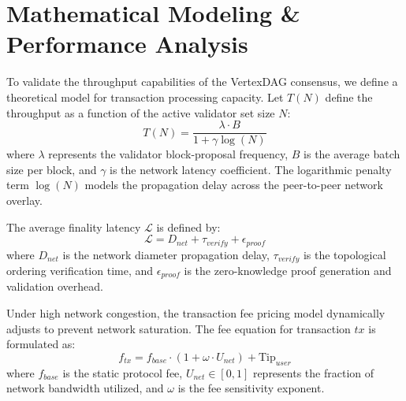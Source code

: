 \section{Mathematical Modeling \& Performance Analysis}
To validate the throughput capabilities of the VertexDAG consensus, we define a theoretical model for transaction processing capacity. Let $T(N)$ define the throughput as a function of the active validator set size $N$:
\begin{equation}
T(N) = \frac{\lambda \cdot B}{1 + \gamma \log(N)}
\end{equation}
where $\lambda$ represents the validator block-proposal frequency, $B$ is the average batch size per block, and $\gamma$ is the network latency coefficient. The logarithmic penalty term $\log(N)$ models the propagation delay across the peer-to-peer network overlay.

The average finality latency $\mathcal{L}$ is defined by:
\begin{equation}
\mathcal{L} = D_{net} + \tau_{verify} + \epsilon_{proof}
\end{equation}
where $D_{net}$ is the network diameter propagation delay, $\tau_{verify}$ is the topological ordering verification time, and $\epsilon_{proof}$ is the zero-knowledge proof generation and validation overhead.

Under high network congestion, the transaction fee pricing model dynamically adjusts to prevent network saturation. The fee equation for transaction $tx$ is formulated as:
\begin{equation}
f_{tx} = f_{base} \cdot (1 + \omega \cdot U_{net}) + \text{Tip}_{user}
\end{equation}
where $f_{base}$ is the static protocol fee, $U_{net} \in [0, 1]$ represents the fraction of network bandwidth utilized, and $\omega$ is the fee sensitivity exponent.
